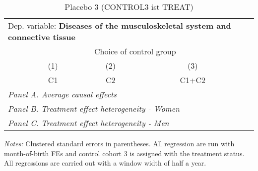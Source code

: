  \begin{table}[H] \centering \begin{threeparttable} \caption{Placebo 3 (CONTROL3 ist TREAT) } {\def\sym#1{\ifmmode^{#1}\else\(^{#1}\)\fi} \begin{tabular}{l*{4}{c}} \toprule \multicolumn{4}{l}{Dep. variable: \textbf{Diseases of the musculoskeletal system and connective tissue}} \\ & \multicolumn{3}{c}{Choice of control group} \\ \cmidrule(lr){2-4}
            &\multicolumn{1}{c}{(1)}&\multicolumn{1}{c}{(2)}&\multicolumn{1}{c}{(3)}\\
            &\multicolumn{1}{c}{C1}&\multicolumn{1}{c}{C2}&\multicolumn{1}{c}{C1+C2}\\
\midrule
 \multicolumn{4}{l}{\emph{Panel A. Average causal effects}} \\      \midrule\multicolumn{4}{l}{\emph{Panel B. Treatment effect heterogeneity - Women}} \\      \midrule\multicolumn{4}{l}{\emph{Panel C. Treatment effect heterogeneity - Men}} \\      
\bottomrule \end{tabular} } \begin{tablenotes} \item \scriptsize \emph{Notes:} Clustered standard errors in parentheses. All regression are run with month-of-birth FEs and control cohort 3 is assigned with the treatment status. All regressions are carried out with a window width of half a year. \end{tablenotes} \end{threeparttable} \end{table} 
